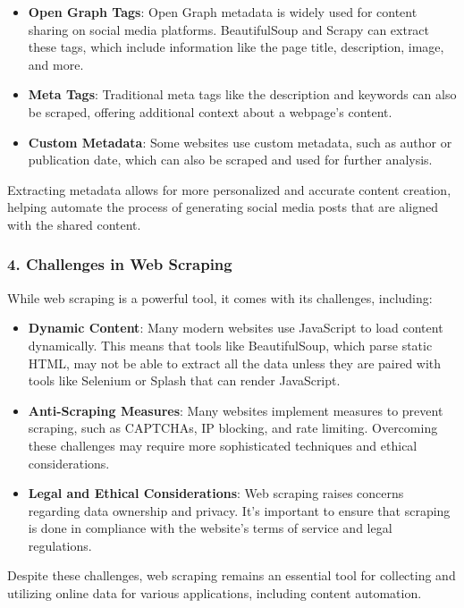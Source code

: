 \begin{itemize}
    \item \textbf{Open Graph Tags}: Open Graph metadata is widely used for content sharing on social media platforms. BeautifulSoup and Scrapy can extract these tags, which include information like the page title, description, image, and more.
    \item \textbf{Meta Tags}: Traditional meta tags like the description and keywords can also be scraped, offering additional context about a webpage's content.
    \item \textbf{Custom Metadata}: Some websites use custom metadata, such as author or publication date, which can also be scraped and used for further analysis.
\end{itemize}

Extracting metadata allows for more personalized and accurate content creation, helping automate the process of generating social media posts that are aligned with the shared content.

\subsubsection{4. Challenges in Web Scraping}

While web scraping is a powerful tool, it comes with its challenges, including:

\begin{itemize}
    \item \textbf{Dynamic Content}: Many modern websites use JavaScript to load content dynamically. This means that tools like BeautifulSoup, which parse static HTML, may not be able to extract all the data unless they are paired with tools like Selenium or Splash that can render JavaScript.
    \item \textbf{Anti-Scraping Measures}: Many websites implement measures to prevent scraping, such as CAPTCHAs, IP blocking, and rate limiting. Overcoming these challenges may require more sophisticated techniques and ethical considerations.
    \item \textbf{Legal and Ethical Considerations}: Web scraping raises concerns regarding data ownership and privacy. It's important to ensure that scraping is done in compliance with the website’s terms of service and legal regulations.
\end{itemize}

Despite these challenges, web scraping remains an essential tool for collecting and utilizing online data for various applications, including content automation.

